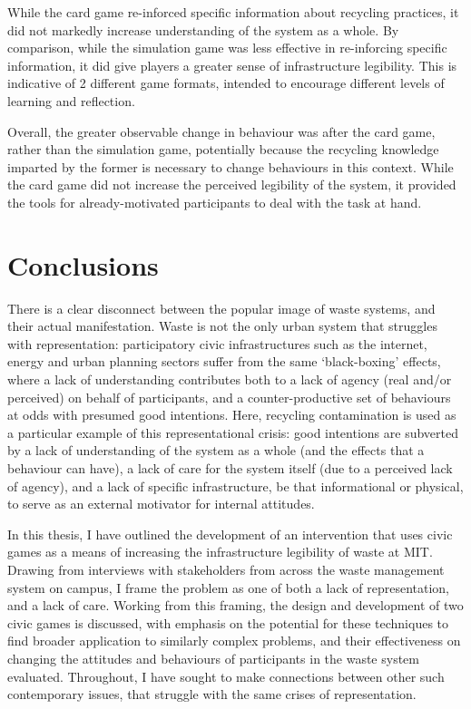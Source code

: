 \documentclass[nofonts,nols,justified,nobib]{tufte-book}
\begin{document}
While the card game re-inforced specific information about recycling practices, it did not markedly increase understanding of the system as a whole. By comparison, while the simulation game was less effective in re-inforcing specific information, it did give players a greater sense of infrastructure legibility. This is indicative of 2 different game formats, intended to encourage different levels of learning and reflection.

Overall, the greater observable change in behaviour was after the card game, rather than the simulation game, potentially because the recycling knowledge imparted by the former is necessary to change behaviours in this context. While the card game did not increase the perceived legibility of the system, it provided the tools for already-motivated participants to deal with the task at hand. 


\chapter*{Conclusions}

There is a clear disconnect between the popular image of waste systems, and their actual manifestation. Waste is not the only urban system that struggles with representation: participatory civic infrastructures such as the internet, energy \cite{onuoha_i_2016} and urban planning sectors suffer from the same `black-boxing' effects, where a lack of understanding contributes both to a lack of agency (real and/or perceived) on behalf of participants, and a counter-productive set of behaviours at odds with presumed good intentions. Here, recycling contamination is used as a particular example of this representational crisis: good intentions are subverted by a lack of understanding of the system as a whole (and the effects that a behaviour can have), a lack of care for the system itself (due to a perceived lack of agency), and a lack of specific infrastructure, be that informational or physical, to serve as an external motivator for internal attitudes.

In this thesis, I have outlined the development of an intervention that uses civic games as a means of increasing the infrastructure legibility of waste at MIT. Drawing from interviews with stakeholders from across the waste management system on campus, I frame the problem as one of both a lack of representation, and a lack of care. Working from this framing, the design and development of two civic games is discussed, with emphasis on the potential for these techniques to find broader application to similarly complex problems, and their effectiveness on changing the attitudes and behaviours of participants in the waste system evaluated. Throughout, I have sought to make connections between other such contemporary issues, that struggle with the same crises of representation.
\end{document}
